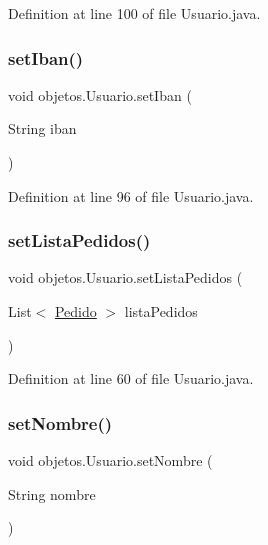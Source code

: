 Definition at line 100 of file Usuario.\+java.

\mbox{\label{classobjetos_1_1_usuario_a1dd10cd5dfebcd7cf424a877839c1079}} 
\subsubsection{\texorpdfstring{set\+Iban()}{setIban()}}
{\footnotesize\ttfamily void objetos.\+Usuario.\+set\+Iban (\begin{DoxyParamCaption}\item[{String}]{iban }\end{DoxyParamCaption})}



Definition at line 96 of file Usuario.\+java.

\mbox{\label{classobjetos_1_1_usuario_ab7bc0d18ecfee488dcf322094629ef5d}} 
\subsubsection{\texorpdfstring{set\+Lista\+Pedidos()}{setListaPedidos()}}
{\footnotesize\ttfamily void objetos.\+Usuario.\+set\+Lista\+Pedidos (\begin{DoxyParamCaption}\item[{List$<$ \mbox{\hyperlink{classobjetos_1_1_pedido}{Pedido}} $>$}]{lista\+Pedidos }\end{DoxyParamCaption})}



Definition at line 60 of file Usuario.\+java.

\mbox{\label{classobjetos_1_1_usuario_af80f3d60addfde641e49e66e6a1f5f8e}} 
\subsubsection{\texorpdfstring{set\+Nombre()}{setNombre()}}
{\footnotesize\ttfamily void objetos.\+Usuario.\+set\+Nombre (\begin{DoxyParamCaption}\item[{String}]{nombre }\end{DoxyParamCaption})}



